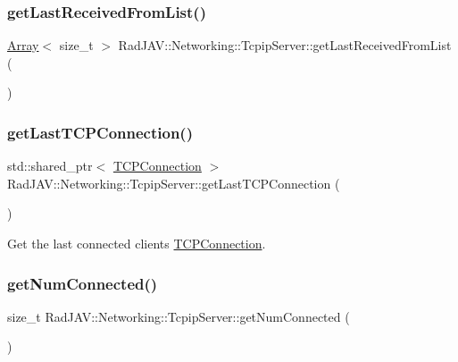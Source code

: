 \subsubsection{\texorpdfstring{get\+Last\+Received\+From\+List()}{getLastReceivedFromList()}}
{\footnotesize\ttfamily \mbox{\hyperlink{class_rad_j_a_v_1_1_array}{Array}}$<$ size\+\_\+t $>$ Rad\+J\+A\+V\+::\+Networking\+::\+Tcpip\+Server\+::get\+Last\+Received\+From\+List (\begin{DoxyParamCaption}{ }\end{DoxyParamCaption})}

\mbox{\label{class_rad_j_a_v_1_1_networking_1_1_tcpip_server_ab3161184633ef9072ba431ca45c408a9}} 
\subsubsection{\texorpdfstring{get\+Last\+T\+C\+P\+Connection()}{getLastTCPConnection()}}
{\footnotesize\ttfamily std\+::shared\+\_\+ptr$<$ \mbox{\hyperlink{class_rad_j_a_v_1_1_networking_1_1_t_c_p_connection}{T\+C\+P\+Connection}} $>$ Rad\+J\+A\+V\+::\+Networking\+::\+Tcpip\+Server\+::get\+Last\+T\+C\+P\+Connection (\begin{DoxyParamCaption}{ }\end{DoxyParamCaption})}



Get the last connected client\textquotesingle{}s \mbox{\hyperlink{class_rad_j_a_v_1_1_networking_1_1_t_c_p_connection}{T\+C\+P\+Connection}}. 

\mbox{\label{class_rad_j_a_v_1_1_networking_1_1_tcpip_server_aefb102dc6cfdccde795918ff3d70c5d8}} 
\subsubsection{\texorpdfstring{get\+Num\+Connected()}{getNumConnected()}}
{\footnotesize\ttfamily size\+\_\+t Rad\+J\+A\+V\+::\+Networking\+::\+Tcpip\+Server\+::get\+Num\+Connected (\begin{DoxyParamCaption}{ }\end{DoxyParamCaption})}



